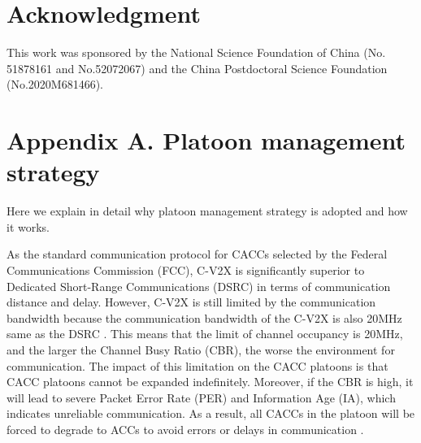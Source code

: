 \documentclass[journal]{IEEEtran}
\begin{document}
%





\section*{Acknowledgment}


This work was sponsored by the National Science Foundation of China (No. 51878161 and No.52072067) and the China Postdoctoral Science Foundation (No.2020M681466).




\appendix
\section*{Appendix A. Platoon management strategy}
Here we explain in detail why platoon management strategy is adopted and how it works.

As the standard communication protocol for CACCs selected by the Federal Communications Commission (FCC), C-V2X is significantly superior to Dedicated Short-Range Communications (DSRC) in terms of communication distance and delay. However, C-V2X is still limited by the communication bandwidth because the communication bandwidth of the C-V2X is also 20MHz same as the DSRC \citep{Boubakri2020,Chen2020,Nardini2018}. This means that the limit of channel occupancy is 20MHz, and the larger the Channel Busy Ratio (CBR), the worse the environment for communication. The impact of this limitation on the CACC platoons is that CACC platoons cannot be expanded indefinitely. Moreover, if the CBR is high, it will lead to severe Packet Error Rate (PER) and Information Age (IA), which indicates unreliable communication. As a result, all CACCs in the platoon will be forced to degrade to ACCs to avoid errors or delays in communication \citep{Vukadinovic2018,Vu2020}.
\end{document}
